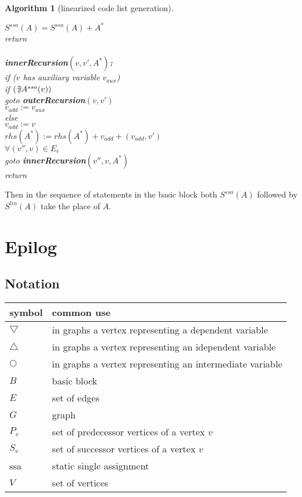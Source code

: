 \documentclass{book}
\newcommand{\notexists}{{ \kern .2em | \kern -.4em \exists }}
\newtheorem{Alg}{Algorithm}
\begin{document}
\begin{Alg}[linearized code list generation]
\begin{tabbing}
\>\> $S^{ssa}(A)=S^{ssa}(A)+A^*$ \\
\> return \\
\\
{\bf innerRecursion$(v,v',A^*)$:}\\
\> if ($v$ has auxiliary variable $v_{aux}$) \\
\>\> if $(\notexists A^{ssa}(v))$\\
\>\>\> goto {\bf outerRecursion}$(v,v')$ \\
\>\> $v_{add}:=v_{aux}$\\
\> else \\
\>\> $v_{add}:=v$\\
\> $rhs(A^*):=rhs(A^*)+v_{add} + (v_{add},v')$\\  
\>\> $\forall (v'',v)\in E_e$ \\
\>\>\> goto {\bf innerRecursion}$(v'',v,A^*)$ \\ 
\> return \\
\end{tabbing}
\end{Alg}

Then in the sequence of statements in the basic block both
$S^{ssa}(A)$ followed by $S^{lin}(A)$ take the place of $A$.

\chapter*{Epilog}
\section{Notation}
\begin{tabular}{|l|l|}\hline
symbol & common use \\\hline
$\bigtriangledown$ & in graphs a vertex representing a dependent variable \\
$\bigtriangleup$ & in graphs a vertex representing an idependent variable \\
$\bigcirc$ & in graphs a vertex representing an intermediate variable \\
$B$ & basic block \\
$E$ & set of edges \\
$G$ & graph \\
$P_v$ & set of predecessor vertices of a vertex $v$ \\
$S_v$ & set of successor vertices of a vertex $v$ \\
ssa & static single assignment \\
$V$ & set of vertices \\\hline
\end{tabular}




\printindex
\end{document}
